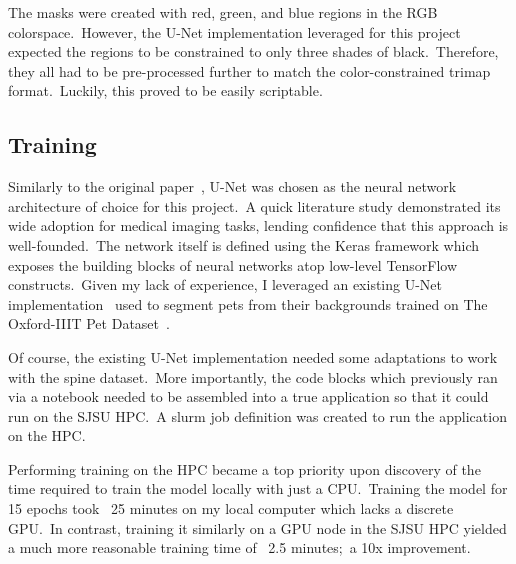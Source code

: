 \documentclass[conference]{IEEEtran}
\begin{document}
    The masks were created with red, green, and blue regions in the RGB colorspace.\ However, the U-Net implementation leveraged for this project expected the regions to be constrained to only three shades of black.\ Therefore, they all had to be pre-processed further to match the color-constrained trimap format.\ Luckily, this proved to be easily scriptable.

    \subsection{Training}\label{subsec:training}

    Similarly to the original paper~\cite{cobb-angle-measurement-of-spine-from-x-ray-images-using-convolutional-neural-network}, U-Net was chosen as the neural network architecture of choice for this project.\ A quick literature study demonstrated its wide adoption for medical imaging tasks, lending confidence that this approach is well-founded.\ The network itself is defined using the Keras framework which exposes the building blocks of neural networks atop low-level TensorFlow constructs.\ Given my lack of experience, I leveraged an existing U-Net implementation~\cite{image-segmentation-with-a-u-net-like-architecture} used to segment pets from their backgrounds trained on The Oxford-IIIT Pet Dataset~\cite{pets-dataset}.

    Of course, the existing U-Net implementation needed some adaptations to work with the spine dataset.\ More importantly, the code blocks which previously ran via a notebook needed to be assembled into a true application so that it could run on the SJSU HPC.\ A slurm job definition was created to run the application on the HPC\@.

    Performing training on the HPC became a top priority upon discovery of the time required to train the model locally with just a CPU.\ Training the model for 15 epochs took ~25 minutes on my local computer which lacks a discrete GPU.\ In contrast, training it similarly on a GPU node in the SJSU HPC yielded a much more reasonable training time of ~2.5 minutes;\ a 10x improvement.
\end{document}
